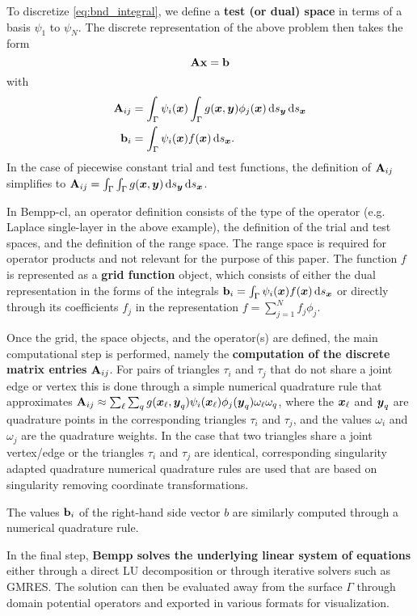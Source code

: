 To discretize \cref{eq:bnd_integral}, we define a \textbf{test (or dual) space} in terms of a basis \(\psi_1\) to \(\psi_N\). The discrete representation of the above problem then takes the form
$$
\mathbf{A}\mathbf{x} = \mathbf{b}
$$
with
\begin{align*}
\dmat{A}_{ij} &= \int_{\Gamma}\psi_i(\bx)\int_{\Gamma}g(\bx, \by)\phi_j(\bx)\ds[\by]\ds[\bx]\\
\dvec{b}_i &= \int_{\Gamma}\psi_i(\bx)f(\bx)\ds[\bx].
\end{align*}
In the case of piecewise constant trial and test functions, the definition of $\mathbf{A}_{ij}$ simplifies to $\dmat{A}_{ij} = \int_{\Gamma}\int_{\Gamma}g(\bx, \by)\ds[\by]\ds[\bx]$.

In Bempp-cl, an operator definition consists of the type of the operator (e.g. Laplace single-layer in the above example),
the definition of the trial and test spaces, and the definition of the range space. The range space is required for operator
products and not relevant for the purpose of this paper. The function $f$ is represented as a \textbf{grid function} object, which
consists of either the dual representation in the forms of the integrals $\dvec{b}_i = \int_{\Gamma}\psi_i(\bx)f(\bx)\ds[\bx]$ or directly through its coefficients $f_j$ in the representation $f=\sum_{j=1}^N f_j\phi_j$.

Once the grid, the space objects, and the operator(s) are defined, the main computational step is performed, namely the \textbf{computation of the discrete matrix entries} $\mathbf{A}_{ij}$. For pairs of triangles $\tau_i$ and $\tau_j$ that do not share a joint edge or vertex this is done through a simple numerical quadrature rule that approximates $\mathbf{A}_{ij}\approx \sum_{\ell}\sum_{q} g(\boldsymbol{x}_\ell, \boldsymbol{y}_q)\psi_i(\boldsymbol{x}_\ell)\phi_j(\boldsymbol{y}_q)\omega_\ell\omega_q$, where the $\boldsymbol{x}_\ell$ and $\boldsymbol{y}_q$ are quadrature points in the corresponding triangles $\tau_i$ and $\tau_j$, and the values $\omega_i$ and $\omega_j$ are the quadrature weights. In the case that two triangles share a joint vertex/edge or the triangles $\tau_i$ and $\tau_j$ are identical, corresponding singularity adapted quadrature numerical quadrature rules are used that are based on singularity removing coordinate transformations.

The values $\mathbf{b}_i$ of the right-hand side vector $b$ are similarly computed through a numerical quadrature rule.

In the final step, \textbf{Bempp solves the underlying linear system of equations} either through a direct LU decomposition or through iterative solvers such as GMRES. The solution can then be evaluated away from the surface $\Gamma$ through domain potential operators and exported in various formats for visualization.

